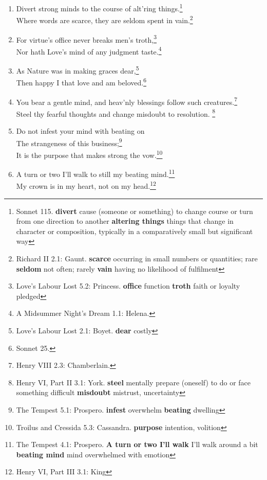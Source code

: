 \documentclass[17pt,twoside]{extarticle}
\begin{document}
\begin{enumerate}
  bounty, virtue, fair humility.\footnote{Richard III 3.7: Buckingham.
    \textbf{bounty} something given or occurring in generous amounts}
\item
  Divert strong minds to the course of alt'ring things.\footnote{Sonnet
    115. \textbf{divert} cause (someone or something) to change course
    or turn from one direction to another \textbf{altering things}
    things that change in character or composition, typically in a
    comparatively small but significant way}\\Where words are scarce,
  they are seldom spent in vain.\footnote{Richard II 2.1: Gaunt.
    \textbf{scarce} occurring in small numbers or quantities; rare
    \textbf{seldom} not often; rarely \textbf{vain} having no likelihood
    of fulfilment}
\item
  For virtue's office never breaks men's troth,\footnote{Love's Labour
    Lost 5.2: Princess. \textbf{office} function \textbf{troth} faith or
    loyalty pledged}\\Nor hath Love's mind of any judgment
  taste.\footnote{A Midsummer Night's Dream 1.1: Helena.}
\item
  As Nature was in making graces dear,\footnote{Love's Labour Lost 2.1:
    Boyet. \textbf{dear} costly}\\Then happy I that love and am
  beloved.\footnote{Sonnet 25.}
\item
  You bear a gentle mind, and heav'nly blessings follow such
  creatures.\footnote{Henry VIII 2.3: Chamberlain.}\\Steel thy fearful
  thoughts and change misdoubt to resolution. \footnote{Henry VI, Part
    II 3.1: York. \textbf{steel} mentally prepare (oneself) to do or
    face something difficult \textbf{misdoubt} mistrust, uncertainty}
\item
  Do not infest your mind with beating on\\The strangeness of this
  business;\footnote{The Tempest 5.1: Prospero. \textbf{infest}
    overwhelm \textbf{beating} dwelling}\\It is the purpose that makes
  strong the vow.\footnote{Troilus and Cressida 5.3: Cassandra.
    \textbf{purpose} intention, volition}
\item
  A turn or two I'll walk to still my beating mind.\footnote{The Tempest
    4.1: Prospero. \textbf{A turn or two I'll walk} I'll walk around a
    bit \textbf{beating mind} mind overwhelmed with emotion}\\My crown
  is in my heart, not on my head.\footnote{Henry VI, Part III 3.1: King
}
\end{enumerate}
\end{document}
